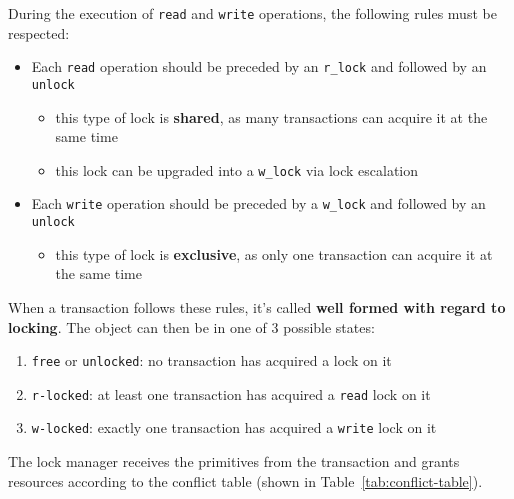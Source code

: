 \documentclass[english]{article}
\begin{document}
During the execution of \texttt{read} and \texttt{write} operations, the following rules must be respected:

\begin{itemize}
  \item Each \texttt{read} operation should be preceded by an \texttt{r\_lock} and followed by an \texttt{unlock}
        \begin{itemize}
          \item this type of lock is \textbf{shared}, as many transactions can acquire it at the same time
          \item this lock can be upgraded into a \texttt{w\_lock} via lock escalation
        \end{itemize}
  \item Each \texttt{write} operation should be preceded by a \texttt{w\_lock} and followed by an \texttt{unlock}
        \begin{itemize}
          \item this type of lock is \textbf{exclusive}, as only one transaction can acquire it at the same time
        \end{itemize}
\end{itemize}

When a transaction follows these rules, it's called \textbf{well formed with regard to locking}.
The object can then be in one of \(3\) possible states:

\begin{enumerate}
  \item \texttt{free} or \texttt{unlocked}: no transaction has acquired a lock on it
  \item \texttt{r-locked}: at least one transaction has acquired a \texttt{read} lock on it
  \item \texttt{w-locked}: exactly one transaction has acquired a \texttt{write} lock on it
\end{enumerate}

The lock manager receives the primitives from the transaction and grants resources according to the conflict table (shown in Table~\ref{tab:conflict-table}).
\end{document}
